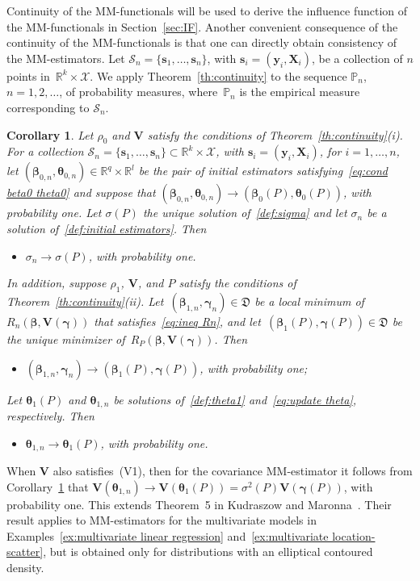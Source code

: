 \documentclass{article}
\numberwithin{equation}{section}
\theoremstyle{plain}
\newtheorem{corollary}{Corollary}
\newcommand{\R}{\mathbb{R}}
\newcommand{\bbeta}{\bm\beta}
\newcommand{\btheta}{\bm\theta}
\newcommand{\bgamma}{\bm\gamma}
\newcommand{\by}{\mathbf{y}}
\newcommand{\bs}{\mathbf{s}}
\newcommand{\bX}{\mathbf{X}}
\newcommand{\bV}{\mathbf{V}}
\begin{document}
Continuity of the MM-functionals will be used to derive the influence function of the MM-functionals in Section~\ref{sec:IF}.
Another convenient consequence of the continuity of the MM-functionals is that one can directly obtain consistency of the MM-estimators.
Let $\mathcal{S}_n=\{\bs_1,\ldots,\bs_n\}$, with $\bs_i=(\by_i,\bX_i)$, be a collection of $n$ points
in~$\R^k\times \mathcal{X}$.
We apply Theorem~\ref{th:continuity} to the sequence $\mathbb{P}_n$, $n=1,2,\ldots$,
of probability measures, where~$\mathbb{P}_n$ is the empirical measure corresponding to $\mathcal{S}_n$.
\begin{corollary}
\label{cor:consistency}
Let $\rho_0$ and $\bV$ satisfy the conditions of Theorem~\ref{th:continuity}(i).
For a collection $\mathcal{S}_n=\{\bs_1,\ldots,\bs_n\}\subset\R^k\times \mathcal{X}$,
with $\bs_i=(\by_i,\bX_i)$, for $i=1,\ldots,n$, 
let $(\bbeta_{0,n},\btheta_{0,n})\in\R^{q}\times\R^l$ be the pair of initial estimators
satisfying~\eqref{eq:cond beta0 theta0} 
and suppose that $(\bbeta_{0,n},\btheta_{0,n})\to(\bbeta_0(P),\btheta_0(P))$, with probability one.
Let $\sigma(P)$ the unique solution of~\eqref{def:sigma}
and let $\sigma_n$ be a solution of~\eqref{def:initial estimators}.
Then
\begin{itemize}
\item[(i)]
$\sigma_n\to\sigma(P)$, with probability one.
\end{itemize}
In addition, suppose $\rho_1$, $\bV$, and $P$ satisfy the conditions of Theorem~\ref{th:continuity}(ii).
Let~$(\bbeta_{1,n},\bgamma_n)\in \mathfrak{D}$ be a local minimum of $R_n(\bbeta,\bV(\bgamma))$
that satisfies~\eqref{eq:ineq Rn}, 
and let~$(\bbeta_1(P),\bgamma(P))\in \mathfrak{D}$ be the unique minimizer of~$R_P(\bbeta,\bV(\bgamma))$.
Then
\begin{itemize}
\item[(ii)]
$(\bbeta_{1,n},\bgamma_n)\to(\bbeta_1(P),\bgamma(P))$, with probability one;
\end{itemize}
Let $\btheta_1(P)$ and $\btheta_{1,n}$ be solutions of~\eqref{def:theta1} 
and~\eqref{eq:update theta}, respectively.
Then 
\begin{itemize}
\item[(iii)]
$\btheta_{1,n}\to \btheta_1(P)$, with probability one.
\end{itemize}
\end{corollary}
When $\bV$ also satisfies~(V1), then for the covariance MM-estimator 
it follows from Corollary~\ref{cor:consistency} that 
$\bV(\btheta_{1,n})\to\bV(\btheta_1(P))=\sigma^2(P)\bV(\bgamma(P))$,
with probability one.
This extends Theorem~5 in Kudraszow and Maronna~\cite{kudraszow-maronna2011}.
Their result applies to MM-estimators for the multivariate models
in Examples~\ref{ex:multivariate linear regression} and~\ref{ex:multivariate location-scatter},
but is obtained only for distributions with an elliptical contoured density.
\end{document}
